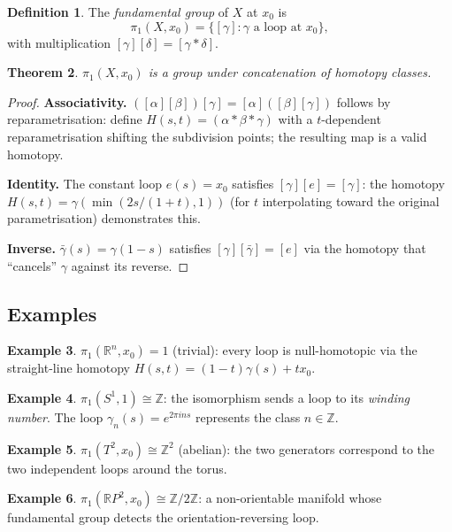 \documentclass[12pt,a4paper]{amsart}
\newtheorem{theorem}{Theorem}[section]
\theoremstyle{definition}
\newtheorem{definition}[theorem]{Definition}
\newtheorem{example}[theorem]{Example}
\begin{document}
\begin{definition}
The \emph{fundamental group} of $X$ at $x_0$ is
\[
  \pi_1(X, x_0) = \{ [\gamma] : \gamma \text{ a loop at } x_0 \},
\]
with multiplication $[\gamma][\delta] = [\gamma * \delta]$.
\end{definition}

\begin{theorem}
$\pi_1(X, x_0)$ is a group under concatenation of homotopy classes.
\end{theorem}
\begin{proof}
\textbf{Associativity.} $([\alpha][\beta])[\gamma] = [\alpha]([\beta][\gamma])$
follows by reparametrisation: define
$H(s,t) = (\alpha * \beta * \gamma)$ with a $t$-dependent reparametrisation
shifting the subdivision points; the resulting map is a valid homotopy.

\textbf{Identity.} The constant loop $e(s) = x_0$ satisfies $[\gamma][e] = [\gamma]$:
the homotopy $H(s,t) = \gamma(\min(2s/(1+t), 1))$ (for $t$ interpolating toward the
original parametrisation) demonstrates this.

\textbf{Inverse.} $\bar{\gamma}(s) = \gamma(1-s)$ satisfies
$[\gamma][\bar{\gamma}] = [e]$ via the homotopy that ``cancels'' $\gamma$
against its reverse.
\end{proof}

\subsection{Examples}

\begin{example}
$\pi_1(\mathbb{R}^n, x_0) = 1$ (trivial): every loop is null-homotopic via
the straight-line homotopy $H(s,t) = (1-t)\gamma(s) + t x_0$.
\end{example}

\begin{example}
$\pi_1(S^1, 1) \cong \mathbb{Z}$: the isomorphism sends a loop to its
\emph{winding number}. The loop $\gamma_n(s) = e^{2\pi i n s}$ represents the
class $n \in \mathbb{Z}$.
\end{example}

\begin{example}
$\pi_1(T^2, x_0) \cong \mathbb{Z}^2$ (abelian): the two generators correspond
to the two independent loops around the torus.
\end{example}

\begin{example}
$\pi_1(\mathbb{R}P^2, x_0) \cong \mathbb{Z}/2\mathbb{Z}$: a non-orientable
manifold whose fundamental group detects the orientation-reversing loop.
\end{example}
\end{document}
